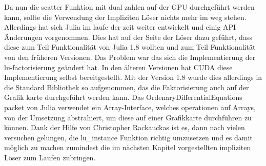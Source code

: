 Da nun die scatter Funktion mit dual zahlen auf der GPU durchgeführt werden kann, 
sollte die Verwendung der Impliziten Löser nichts mehr im weg stehen.
Allerdings hat sich Julia im laufe der zeit weiter entwickelt und einig API Änderungen vorgenommen.
Dies hat auf der Seite der Löser dazu geführt, dass diese zum Teil Funktionalität von Julia 1.8 wollten und zum Teil Funktionalität von den früheren Versionen.
Das Problem war das sich die Implementierung der lu-factorisierung geändert hat.
In den älteren Versionen hat CUDA diese Implementierung selbst bereitgestellt.
Mit der Version 1.8 wurde dies allerdings in die Standard Bibliothek so aufgenommen, das die Faktorisierung 
auch auf der Grafik karte durchgeführt werden kann.
Das OrdenaryDifferentialEquations packet von Julia verwendet 
ein Array-Interface, welches operationen auf Arrays, 
von der Umsetzung abstrahiert, um diese auf einer Grafikkarte durchführen zu können.
Dank der Hilfe von Christopher Rackauckas ist es, dann nach vielen versuchen gelungen, die lu\_instance Funktion richtig umzusetzen 
und es damit möglich zu machen zumindest die im nächsten Kapitel vorgestellten impliziten Löser zum Laufen zubringen.










